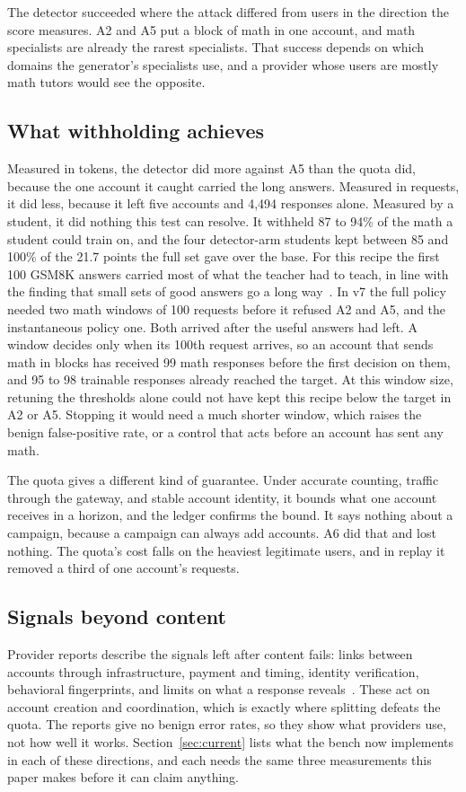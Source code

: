 \documentclass[journal]{IEEEtran}
\begin{document}
The detector succeeded where the attack differed from users in the direction the score measures. A2 and A5 put a block of math in one account, and math specialists are already the rarest specialists. That success depends on which domains the generator's specialists use, and a provider whose users are mostly math tutors would see the opposite.

\subsection{What withholding achieves}
Measured in tokens, the detector did more against A5 than the quota did, because the one account it caught carried the long answers. Measured in requests, it did less, because it left five accounts and 4,494 responses alone. Measured by a student, it did nothing this test can resolve. It withheld 87 to 94\% of the math a student could train on, and the four detector-arm students kept between 85 and 100\% of the 21.7 points the full set gave over the base. For this recipe the first 100 GSM8K answers carried most of what the teacher had to teach, in line with the finding that small sets of good answers go a long way~\cite{muennighoff2025s1}. In v7 the full policy needed two math windows of 100 requests before it refused A2 and A5, and the instantaneous policy one. Both arrived after the useful answers had left. A window decides only when its 100th request arrives, so an account that sends math in blocks has received 99 math responses before the first decision on them, and 95 to 98 trainable responses already reached the target. At this window size, retuning the thresholds alone could not have kept this recipe below the target in A2 or A5. Stopping it would need a much shorter window, which raises the benign false-positive rate, or a control that acts before an account has sent any math.

The quota gives a different kind of guarantee. Under accurate counting, traffic through the gateway, and stable account identity, it bounds what one account receives in a horizon, and the ledger confirms the bound. It says nothing about a campaign, because a campaign can always add accounts. A6 did that and lost nothing. The quota's cost falls on the heaviest legitimate users, and in replay it removed a third of one account's requests.

\subsection{Signals beyond content}
Provider reports describe the signals left after content fails: links between accounts through infrastructure, payment and timing, identity verification, behavioral fingerprints, and limits on what a response reveals~\cite{anthropic2026detecting,anthropic2026defenses,openai2026disrupting}. These act on account creation and coordination, which is exactly where splitting defeats the quota. The reports give no benign error rates, so they show what providers use, not how well it works. Section~\ref{sec:current} lists what the bench now implements in each of these directions, and each needs the same three measurements this paper makes before it can claim anything.
\end{document}
